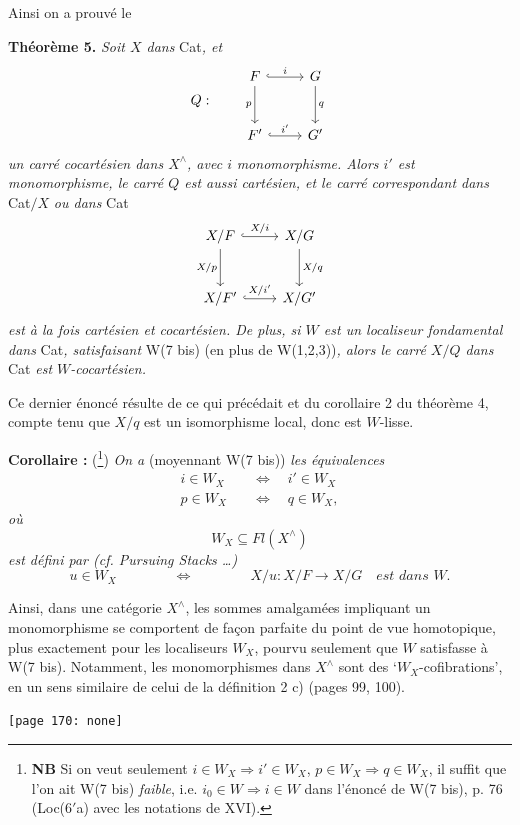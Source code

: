 \documentclass[11pt]{article}
\newcommand{\printedpage}[1]{\marginpar{\footnotesize p.~#1}}
\newcommand{\msp}[1]{\marginpar{\footnotesize [#1]}}
\begin{document}
Ainsi on a prouvé le

\textbf{Théorème 5.} \textit{Soit $X$ dans} Cat\textit{, et}
\[
Q : \qquad
\begin{tikzcd}[row sep=large, baseline=(current bounding box.center)]
F \arrow[r, hook, "i"] \arrow[d, "p"'] & G \arrow[d, "q"] \\
F' \arrow[r, hook, "i'"] & G'
\end{tikzcd}
\]
\textit{un carré cocartésien dans $X^\wedge$, avec $i$} \textit{monomorphisme. Alors $i'$ est} \textit{monomorphisme, le carré $Q$ est aussi cartésien, et le carré correspondant dans} Cat$/X$ \textit{ou dans} Cat
\[
\begin{tikzcd}[row sep=large]
X/F \arrow[r, hook, "X/i"] \arrow[d, "X/p"'] & X/G \arrow[d, "X/q"] \\
X/F' \arrow[r, hook, "X/i'"] & X/G'
\end{tikzcd}
\]
\msp{page 168} \textit{est à la fois cartésien et cocartésien. De plus, si $W$ est un localiseur fondamental dans} Cat\textit{, satisfaisant} W(7 bis) (en plus de W(1,2,3))\textit{, alors le carré $X/Q$ dans} Cat \textit{est $W$-cocartésien.}

\printedpage{114}
Ce dernier énoncé résulte de ce qui précédait et du corollaire 2 du théorème 4, compte tenu que $X/q$ est un isomorphisme local, donc est $W$-lisse.

\textbf{Corollaire :} (\footnote[111]{\textbf{NB} Si on veut seulement $i \in W_X \Longrightarrow i' \in W_X$, $p \in W_X \Longrightarrow q \in W_X$, il suffit que l’on ait W(7 bis) \textit{faible}, i.e. $i_0 \in W \Longrightarrow i \in W$ dans l’énoncé de W(7 bis), p. 76 (Loc(6$'$a) avec les notations de XVI).}) \textit{On a} (moyennant W(7 bis)) \textit{les équivalences}
\[
\begin{aligned}
i \in W_X \quad &\Longleftrightarrow \quad i' \in W_X \\
p \in W_X \quad &\Longleftrightarrow \quad q \in W_X,
\end{aligned}
\]
\textit{où}
\[
W_X \subseteq \mathit{Fl}(X^\wedge)
\]
\textit{est défini par (cf. Pursuing Stacks \ldots)}
\[
u \in W_X \qquad\qquad \Longleftrightarrow \qquad\qquad X/u : X/F \longrightarrow X/G \quad \textit{est dans } W.
\]

Ainsi, dans une catégorie $X^\wedge$, les sommes amalgamées impliquant un monomorphisme se comportent de façon parfaite du point de vue homotopique, plus exactement pour les localiseurs $W_X$, pourvu \msp{page 169} seulement que $W$ satisfasse à W(7 bis). Notamment, les monomorphismes dans $X^\wedge$ sont des ‘$W_X$-cofibrations’, en un sens similaire de celui de la définition 2 c) (pages 99, 100).

\texttt{[page 170: none]}
\end{document}

